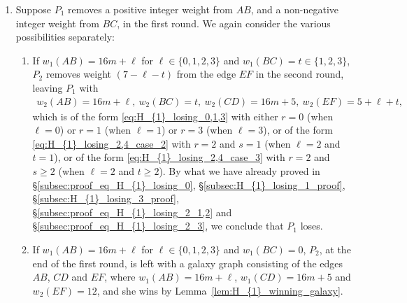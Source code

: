 \documentclass[11pt,reqno]{amsart}
\theoremstyle{definition}
\theoremstyle{definition}
\begin{document}
\begin{enumerate}
\begin{enumerate}
\item If $w_{1}(CD)=16m+\ell$ for some $\ell \in \{0,1,2,3,4\}$ and $w_{1}(BC)=0$, $P_{2}$, at the end of the first round, is left with a galaxy graph consisting of the edges $AB$, $CD$ and $EF$, where $w_{1}(AB)=16m+4$, $w_{1}(CD)=16m+\ell$ and $w_{1}(EF)=12$, and she wins by Lemma~\ref{lem:H_{1}_winning_galaxy}.

\item Finally, if $w_{1}(CD)=16n+\ell_{1}$ for some $n<m$ and $\ell_{1}\in\{0,1,\ldots,15\}$, the configuration after the first round is of the form given by Lemma~\ref{prop:H_{1}_winning_1} with $m_{1}=n$, $m_{2}=m$ and $\ell_{2}=4$. Since $n<m \implies m_{1}\neq m_{2}$, $P_{2}$ wins by Lemma~\ref{prop:H_{1}_winning_1}.
\end{enumerate} 

\item Suppose $P_{1}$ removes a positive integer weight from $AB$, and a non-negative integer weight from $BC$, in the first round. We again consider the various possibilities separately:
\begin{enumerate}
\item If $w_{1}(AB)=16m+\ell$ for $\ell \in \{0,1,2,3\}$ and $w_{1}(BC)=t\in\{1,2,3\}$, $P_{2}$ removes weight $(7-\ell-t)$ from the edge $EF$ in the second round, leaving $P_{1}$ with
\begin{align}
w_{2}(AB)=16m+\ell,\ w_{2}(BC)=t,\ w_{2}(CD)=16m+5,\ w_{2}(EF)=5+\ell+t,\nonumber
\end{align}
which is of the form \eqref{eq:H_{1}_losing_0,1,3} with either $r=0$ (when $\ell=0$) or $r=1$ (when $\ell=1$) or $r=3$ (when $\ell=3$), or of the form \eqref{eq:H_{1}_losing_2,4_case_2} with $r=2$ and $s=1$ (when $\ell=2$ and $t=1$), or of the form \eqref{eq:H_{1}_losing_2,4_case_3} with $r=2$ and $s\geqslant 2$ (when $\ell=2$ and $t\geqslant 2$). By what we have already proved in \S\ref{subsec:proof_eq_H_{1}_losing_0}, \S\ref{subsec:H_{1}_losing_1_proof}, \S\ref{subsec:H_{1}_losing_3_proof}, \S\ref{subsec:proof_eq_H_{1}_losing_2_1,2} and \S\ref{subsec:proof_eq_H_{1}_losing_2_3}, we conclude that $P_{1}$ loses. 

\item If $w_{1}(AB)=16m+\ell$ for $\ell \in \{0,1,2,3\}$ and $w_{1}(BC)=0$, $P_{2}$, at the end of the first round, is left with a galaxy graph consisting of the edges $AB$, $CD$ and $EF$, where $w_{1}(AB)=16m+\ell$, $w_{1}(CD)=16m+5$ and $w_{2}(EF)=12$, and she wins by Lemma~\ref{lem:H_{1}_winning_galaxy}. 
\end{enumerate}


\end{enumerate}
\end{document}
